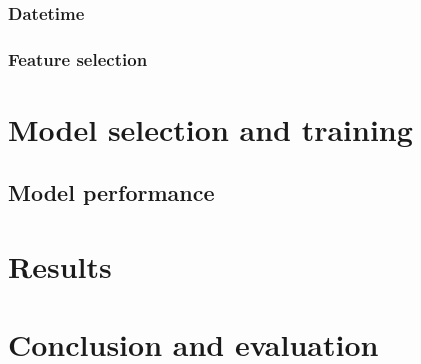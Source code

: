 \documentclass{article}
\begin{document}
\subsubsection{Datetime}


\subsubsection{Feature selection}


\section{Model selection and training}

\subsection{Model performance}

\section{Results}

\section{Conclusion and evaluation}

\printbibliography
\end{document}
